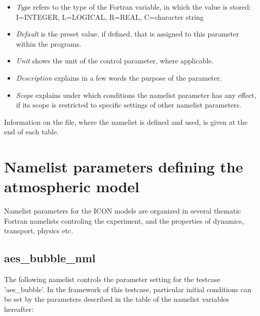 \begin{itemize}
\item \emph{Type} refers to the type of the Fortran variable, in which the
value is stored: I=INTEGER, L=LOGICAL, R=REAL, C=character string
\item \emph{Default} is the preset value, if defined, that is assigned to
this parameter within the programs.
\item \emph{Unit} shows the unit of the control parameter, where applicable.
\item \emph{Description} explains in a few words the purpose of the parameter.
\item \emph{Scope} explains under which conditions the namelist parameter
has any effect, if its scope is restricted to specific settings of
other namelist parameters.
\end{itemize}
Information on the file, where the namelist is defined and used, is
given at the end of each table.



\section{Namelist parameters defining the atmospheric model}

Namelist parameters for the ICON models are organized in several thematic
Fortran namelists controling the experiment, and the properties of
dynamics, transport, physics etc.


\subsection{aes\_bubble\_nml}

The following namelist controls the parameter setting for the testcase
'aes\_bubble'. In the framework of this testcase, particular initial
conditions can be set by the parameters described in the table of the
namelist variables hereafter:

